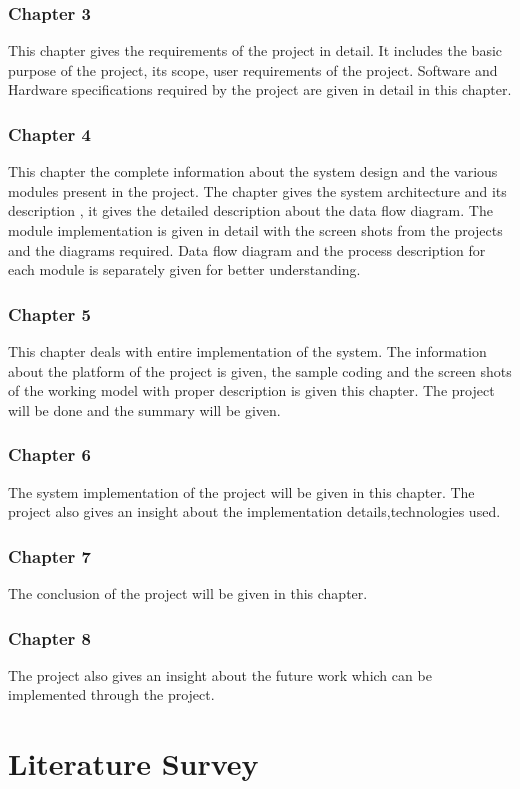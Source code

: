 \documentclass[BTech]{srmuthesis}
\begin{document}
\subsection*{Chapter 3}
This chapter gives the requirements of the project in detail. It includes the basic purpose of the project, its scope, user requirements of the project. Software and Hardware specifications required by the project are given in detail in this chapter.

\subsection*{Chapter 4}
This chapter the complete information about the system design and the various modules present in the project. The chapter gives the system architecture and its description , it gives the detailed description about the data flow diagram. The module implementation is given in detail with the screen shots from the projects and the diagrams required. Data flow diagram and the process description for each module is separately given for better understanding.

\subsection*{Chapter 5}
This chapter deals with entire implementation of the system. The information about the platform of the project is given, the sample coding and the screen shots of the working model with proper description is given this chapter. The project will be done and the summary will be given.
\subsection*{Chapter 6}
The system implementation of the project will be given in this chapter. The project also gives an insight
about the implementation details,technologies used.
\subsection*{Chapter 7}
The conclusion of the project will be given in this chapter.
\subsection*{Chapter 8}
The project also gives an insight about the future work which can be implemented through the project.
\chapter{Literature Survey}
\end{document}
